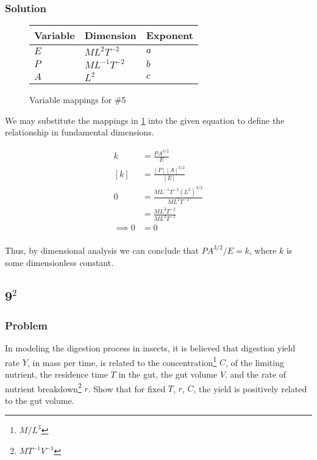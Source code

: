 \documentclass[12pt]{article}
\begin{document}
  \subsubsection*{Solution}
  \begin{figure}
    \centering
    \begin{tabularx}{0.5\textwidth}{XXX}
      Variable & Dimension & Exponent \\ \midrule
      $E$ & $ML^2T^{-2}$ & $a$ \\
      $P$ & $ML^{-1}T^{-2}$ & $b$ \\
      $A$ & $L^2$ & $c$ \\
    \end{tabularx}
    \caption{Variable mappings for \#5}
\label{fig:5-var-mappings}
  \end{figure}

  We may substitute the mappings in \cref{fig:5-var-mappings} into the given
  equation to define the relationship in fundamental dimensions.

  \begin{equation}
    \label{eq:5-substitution}
    \boxed{
    \begin{aligned}
      k &= \frac{PA^{3/2}}{E} \\
      [k] &= \frac{[P]{[A]}^{3/2}}{[E]} \\
      0 &= \frac{ML^{-1}T^{-2}{(L^2)}^{3/2}}{ML^2T^{-2}} \\
      &= \frac{ML^2T^{-2}}{ML^2T^{-2}} \\
      \implies 0 &= 0 \\
    \end{aligned}
    }
  \end{equation}

  Thus, by dimensional analysis we can conclude that $PA^{3/2}/E=k$, where $k$
  is some dimensionless constant.

  \newpage
\subsection{9$^2$}
  \subsubsection*{Problem}
  In modeling the digestion process in insects, it is believed that digestion
  yield rate $Y$, in mass per time, is related to the
  concentration\footnote{$M/L^3$} $C$, of the limiting nutrient, the residence
  time $T$ in the gut, the gut volume $V$, and the rate of nutrient
  breakdown\footnote{$MT^{-1}V^{-1}$} $r$. Show that for fixed $T$, $r$, $C$,
  the yield is positively related to the gut volume.
\end{document}
